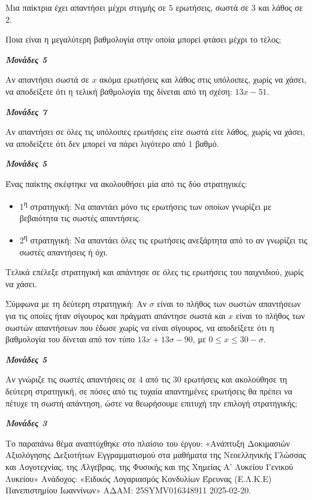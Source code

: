 \documentclass[11pt,a4paper,twoside]{book}
\newcommand{\monades}[1]{
\hspace*{\fill}
\textbf{\textit{\textcolor{maincolor}{Μονάδες #1}}}}
\begin{document}
\begin{alist}
\item Μια παίκτρια έχει απαντήσει μέχρι στιγμής σε $5$ ερωτήσεις, σωστά σε $3$ και λάθος σε $2$.

\begin{rlist}
\item Ποια είναι η μεγαλύτερη βαθμολογία στην οποία μπορεί φτάσει μέχρι το τέλος;
\monades{5}
\item Αν απαντήσει σωστά σε $x$ ακόμα ερωτήσεις και λάθος στις υπόλοιπες, χωρίς να χάσει, να αποδείξετε ότι η τελική βαθμολογία της δίνεται από τη σχέση: $13x - 51$.
\monades{7}
\item Αν απαντήσει σε όλες τις υπόλοιπες ερωτήσεις είτε σωστά είτε λάθος, χωρίς να χάσει, να αποδείξετε ότι δεν μπορεί να πάρει λιγότερο από $1$ βαθμό.
\monades{5}
\end{rlist}
\item Ένας παίκτης σκέφτηκε να ακολουθήσει μία από τις δύο στρατηγικές:

\begin{itemize}
\item
  1\textsuperscript{η} στρατηγική: Να απαντάει μόνο τις ερωτήσεις των οποίων γνωρίζει με βεβαιότητα τις σωστές απαντήσεις.
\item
  2\textsuperscript{η} στρατηγική: Να απαντάει όλες τις ερωτήσεις ανεξάρτητα από το αν γνωρίζει τις σωστές απαντήσεις ή όχι.
\end{itemize}

Τελικά επέλεξε στρατηγική και απάντησε σε όλες τις ερωτήσεις του παιχνιδιού, χωρίς να χάσει.

\begin{rlist}
\item Σύμφωνα με τη δεύτερη στρατηγική: Αν $\sigma$ είναι το πλήθος των σωστών απαντήσεων για τις οποίες ήταν σίγουρος και πράγματι απάντησε σωστά και $x$ είναι το πλήθος των σωστών απαντήσεων που έδωσε χωρίς να είναι σίγουρος, να αποδείξετε ότι η βαθμολογία του δίνεται από τον τύπο $13x + 13\sigma - 90$, με $0 \leq x \leq 30 - \sigma$.
\monades{5}
\item Αν γνώριζε τις σωστές απαντήσεις σε $4$ από τις $30$ ερωτήσεις και ακολούθησε τη δεύτερη στρατηγική, σε πόσες από τις τυχαία απαντημένες ερωτήσεις θα πρέπει να πέτυχε τη σωστή απάντηση, ώστε να θεωρήσουμε επιτυχή την επιλογή στρατηγικής;
\monades{3}

{\footnotesize Το παραπάνω θέμα αναπτύχθηκε στο πλαίσιο του έργου: «Ανάπτυξη Δοκιμασιών Αξιολόγησης Δεξιοτήτων Εγγραμματισμού στα μαθήματα της Νεοελληνικής Γλώσσας και Λογοτεχνίας, της Άλγεβρας, της Φυσικής και της Χημείας Α' Λυκείου Γενικού Λυκείου» Ανάδοχος: «Ειδικός Λογαριασμός Κονδυλίων Έρευνας (Ε.Λ.Κ.Ε) Πανεπιστημίου Ιωαννίνων» ΑΔΑΜ: 25SYMV016348911 2025-02-20.}
\end{rlist}
\end{alist}
\end{document}
